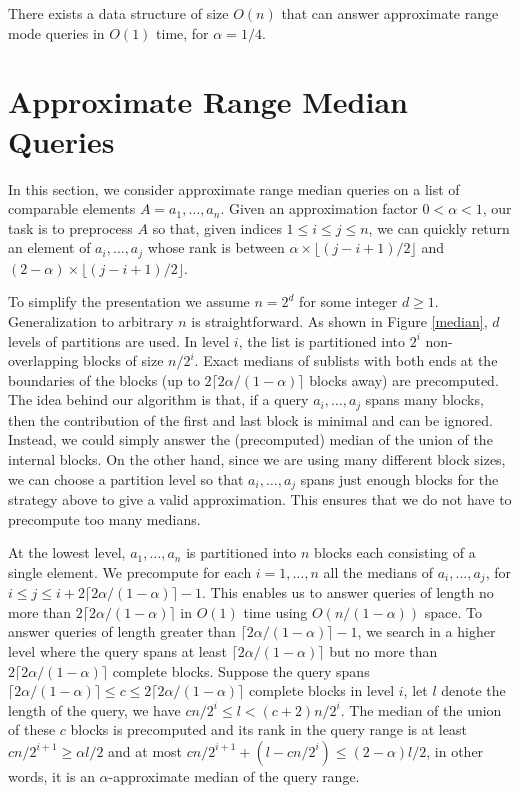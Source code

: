 \documentclass{llncs}
\begin{document}
\begin{theorem}
There exists a data structure of size $O(n)$ that can answer approximate range mode
queries in $O(1)$ time, for $\alpha=1/4$.
\end{theorem}


\section{Approximate Range Median Queries}


In this section, we consider approximate range median queries on a list of comparable 
elements $A=a_1,\ldots,a_n$. Given an approximation factor $0 < \alpha < 1$, our 
task is to preprocess $A$ so that, given indices $1 \leq i \leq j \leq n$, we can 
quickly return an element of $a_i,\ldots,a_j$ whose rank is between
$\alpha \times \lfloor (j-i+1)/2 \rfloor$ and
$(2-\alpha) \times \lfloor (j-i+1)/2 \rfloor$.


To simplify the presentation we assume $n=2^d$ for some integer $d
\geq 1$. Generalization to arbitrary $n$ is straightforward. 
As shown in Figure \ref{median}, $d$ levels of partitions are used. In 
level $i$, the list is partitioned into $2^i$ non-overlapping blocks of 
size $n/2^i$. Exact medians of sublists with both ends at the boundaries
of the blocks (up to $2 \lceil 2 \alpha / (1- \alpha) \rceil$ blocks 
away) are precomputed. The idea behind 
our algorithm is that, if a query $a_i, \ldots, a_j$ spans many blocks, 
then the contribution of the first and last block is minimal and can
be ignored. Instead, we could simply answer the (precomputed) median 
of the union of the internal blocks. 
On the other hand, since we are using many different block sizes, we
can choose a partition level so that $a_i, \ldots, a_j$ spans just 
enough blocks for the strategy above to give a valid approximation. 
This ensures that we do not have to precompute too many medians.


At the lowest level, $a_1,\ldots,a_n$ is 
partitioned into $n$ blocks each consisting of a single element.
We precompute for each $i=1,\ldots,n$ all the medians of
$a_i,\ldots,a_j$, for $i \leq j \leq i+2 \lceil 2 \alpha / (1- \alpha)
\rceil -1$. This enables us to answer queries
of length no more than $2 \lceil 2 \alpha / (1- \alpha) \rceil$ in
$O(1)$ time using $O(n/(1-\alpha))$ space. To answer queries 
of length greater than 
$\lceil 2 \alpha / (1- \alpha)\rceil -1$, we search in a higher level 
where the query spans at least  $\lceil 2 \alpha / (1- \alpha) \rceil$ but no 
more than $2 \lceil 2 \alpha / (1- \alpha) \rceil$ complete blocks.
Suppose the query 
spans $\lceil 2 \alpha / (1- \alpha) \rceil 
\le c \le 2 \lceil 2 \alpha / (1- \alpha) \rceil$ complete blocks in level
$i$, let $l$ denote the length of the query, we have  
$cn/2^i \le l < (c+2) n/2^i$. The median of the union 
of these $c$ blocks is precomputed and
its rank in the query range is at least $cn/2^{i+1} \ge \alpha l/2 $ and at 
most $cn/2^{i+1} + (l-cn/2^i) \le (2-\alpha)l/2$, in other words,
it is an $\alpha$-approximate median of the query range.
\end{document}
